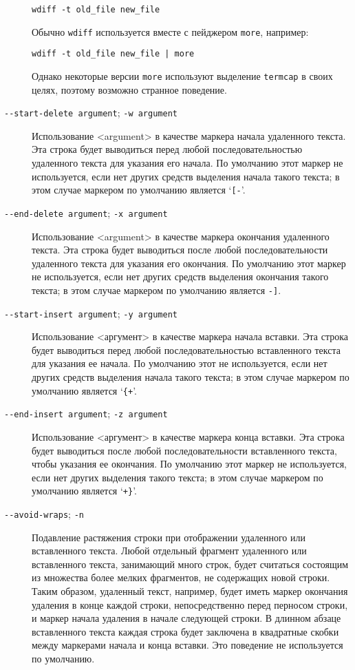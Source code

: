 \begin{description}
\begin{verbatim}
wdiff -t old_file new_file
\end{verbatim}

Обычно \texttt{wdiff} используется вместе с пейджером \texttt{more},
например:

\begin{verbatim}
wdiff -t old_file new_file | more
\end{verbatim}

Однако некоторые версии \texttt{more} используют выделение
\texttt{termcap} в своих целях, поэтому возможно странное поведение.
\item[\texttt{-\/-start-delete\ argument}; \texttt{-w\ argument}]
Использование \textless argument\textgreater{} в качестве маркера начала
удаленного текста. Эта строка будет выводиться перед любой
последовательностью удаленного текста для указания его начала. По
умолчанию этот маркер не используется, если нет других средств выделения
начала такого текста; в этом случае маркером по умолчанию является
`\texttt{{[}-}'.
\item[\texttt{-\/-end-delete\ argument}; \texttt{-x\ argument}]
Использование \textless argument\textgreater{} в качестве маркера
окончания удаленного текста. Эта строка будет выводиться после любой
последовательности удаленного текста для указания его окончания. По
умолчанию этот маркер не используется, если нет других средств выделения
окончания такого текста; в этом случае маркером по умолчанию является
\texttt{-{]}}.
\item[\texttt{-\/-start-insert\ argument}; \texttt{-y\ argument}]
Использование \textless аргумент\textgreater{} в качестве маркера начала
вставки. Эта строка будет выводиться перед любой последовательностью
вставленного текста для указания ее начала. По умолчанию этот не
используется, если нет других средств выделения начала такого текста; в
этом случае маркером по умолчанию является `\texttt{\{+}'.
\item[\texttt{-\/-end-insert\ argument}; \texttt{-z\ argument}]
Использование \textless аргумент\textgreater{} в качестве маркера конца
вставки. Эта строка будет выводиться после любой последовательности
вставленного текста, чтобы указания ее окончания. По умолчанию этот
маркер не используется, если нет других выделения такого текста; в этом
случае маркером по умолчанию является `\texttt{+\}}'.
\item[\texttt{-\/-avoid-wraps}; \texttt{-n}]
Подавление растяжения строки при отображении удаленного или вставленного
текста. Любой отдельный фрагмент удаленного или вставленного текста,
занимающий много строк, будет считаться состоящим из множества более
мелких фрагментов, не содержащих новой строки. Таким образом, удаленный
текст, например, будет иметь маркер окончания удаления в конце каждой
строки, непосредственно перед перносом строки, и маркер начала удаления
в начале следующей строки. В длинном абзаце вставленного текста каждая
строка будет заключена в квадратные скобки между маркерами начала и
конца вставки. Это поведение не используется по умолчанию.
\end{description}

